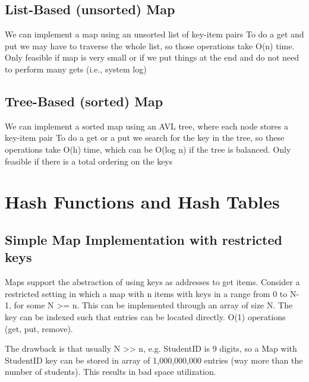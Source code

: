 \documentclass[12pt]{article}
\newcommand{\1}{\space \quad}
\newcommand{\2}{\quad \quad \quad}
\newcommand{\3}{\quad \quad \quad \quad \space}
\newcommand{\4}{\quad \quad \quad \quad \quad \quad}
\begin{document}
\subsection{List-Based (unsorted) Map}
We can implement a map using an unsorted list of key-item pairs
To do a get and put we may have to traverse the whole list, so
those operations take O(n) time.
Only feasible if map is very small or if we put things at the end
and do not need to perform many gets (i.e., system log) 

\subsection{Tree-Based (sorted) Map}
We can implement a sorted map using an AVL tree, where each
node stores a key-item pair
To do a get or a put we search for the key in the tree, so these
operations take O(h) time, which can be O(log n) if the tree is
balanced.
Only feasible if there is a total ordering on the keys

\section{Hash Functions and Hash Tables}

\subsection{Simple Map Implementation with restricted keys}
Maps support the abstraction of using keys as addresses to get items. Consider a restricted setting in which a 
map with n items with keys in a range from 0 to N-1, for some N >= n. This can be implemented through an array of size
N. The key can be indexed such that entries can be located directly. O(1) operations (get, put, remove).

\vspace{10pt}
The drawback is that usually N >> n, e.g. StudentID is 9 digits, so a Map with StudentID key can be stored in array of 1,000,000,000 entries
(way more than the number of students). This results in bad space utilization.
\end{document}
